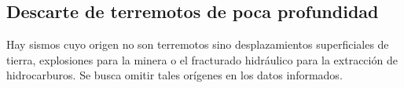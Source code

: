 \documentclass[a4paper]{report}
\begin{document}





\subsection{Descarte de terremotos de poca profundidad}

Hay sismos cuyo origen no son terremotos sino desplazamientos superficiales de tierra, explosiones para la minera o el fracturado hidráulico para la extracción de hidrocarburos.
Se busca omitir tales orígenes en los datos informados.
\end{document}
